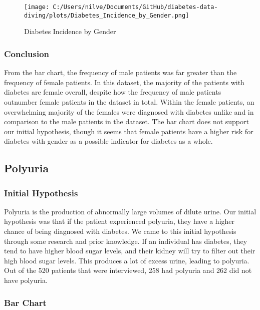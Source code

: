 \documentclass[
]{article}
\begin{document}
\begin{figure}
\centering
\texttt{[image: C:/Users/nilve/Documents/GitHub/diabetes-data-diving/plots/Diabetes\_Incidence\_by\_Gender.png]}
\caption{Diabetes Incidence by Gender}
\end{figure}

\hypertarget{header-n876}{%
\subsubsection{Conclusion}\label{header-n876}}

From the bar chart, the frequency of male patients was far greater than
the frequency of female patients. In this dataset, the majority of the
patients with diabetes are female overall, despite how the frequency of
male patients outnumber female patients in the dataset in total. Within
the female patients, an overwhelming majority of the females were
diagnosed with diabetes unlike and in comparison to the male patients in
the dataset. The bar chart does not support our initial hypothesis,
though it seems that female patients have a higher risk for diabetes
with gender as a possible indicator for diabetes as a whole.

\hypertarget{header-n878}{%
\subsection{Polyuria}\label{header-n878}}

\hypertarget{header-n879}{%
\subsubsection{Initial Hypothesis}\label{header-n879}}

Polyuria is the production of abnormally large volumes of dilute urine.
Our initial hypothesis was that if the patient experienced polyuria,
they have a higher chance of being diagnosed with diabetes. We came to
this initial hypothesis through some research and prior knowledge. If an
individual has diabetes, they tend to have higher blood sugar levels,
and their kidney will try to filter out their high blood sugar levels.
This produces a lot of excess urine, leading to polyuria. Out of the 520
patients that were interviewed, 258 had polyuria and 262 did not have
polyuria.

\hypertarget{header-n881}{%
\subsubsection{Bar Chart}\label{header-n881}}
\end{document}
